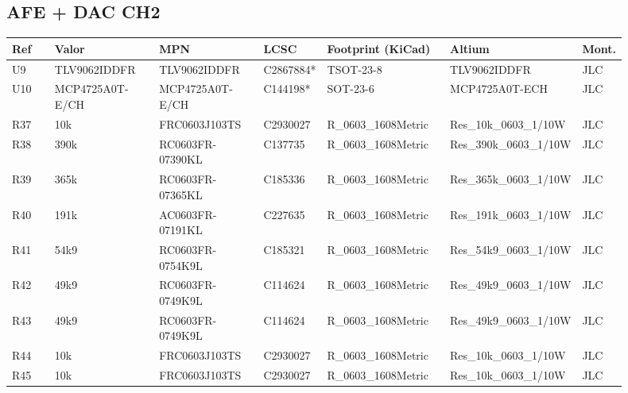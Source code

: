 \documentclass[10pt,a4paper]{article}
\begin{document}
\subsection*{AFE + DAC CH2}
{\scriptsize\begin{longtable}{@{}L{0.07\linewidth}L{0.17\linewidth}L{0.17\linewidth}L{0.09\linewidth}L{0.20\linewidth}L{0.14\linewidth}L{0.06\linewidth}@{}}\toprule
\textbf{Ref} & \textbf{Valor} & \textbf{MPN} & \textbf{LCSC} & \textbf{Footprint (KiCad)} & \textbf{Altium} & \textbf{Mont.}\\\midrule\endhead
U9 & TLV9062IDDFR & TLV9062IDDFR & C2867884* & TSOT-23-8 & TLV9062IDDFR & JLC\\
U10 & MCP4725A0T-E/CH & MCP4725A0T-E/CH & C144198* & SOT-23-6 & MCP4725A0T-ECH & JLC\\
R37 & 10k & FRC0603J103TS & C2930027 & R\_\allowbreak{}0603\_\allowbreak{}1608Metric & Res\_\allowbreak{}10k\_\allowbreak{}0603\_\allowbreak{}1/10W & JLC\\
R38 & 390k & RC0603FR-07390KL & C137735 & R\_\allowbreak{}0603\_\allowbreak{}1608Metric & Res\_\allowbreak{}390k\_\allowbreak{}0603\_\allowbreak{}1/10W & JLC\\
R39 & 365k & RC0603FR-07365KL & C185336 & R\_\allowbreak{}0603\_\allowbreak{}1608Metric & Res\_\allowbreak{}365k\_\allowbreak{}0603\_\allowbreak{}1/10W & JLC\\
R40 & 191k & AC0603FR-07191KL & C227635 & R\_\allowbreak{}0603\_\allowbreak{}1608Metric & Res\_\allowbreak{}191k\_\allowbreak{}0603\_\allowbreak{}1/10W & JLC\\
R41 & 54k9 & RC0603FR-0754K9L & C185321 & R\_\allowbreak{}0603\_\allowbreak{}1608Metric & Res\_\allowbreak{}54k9\_\allowbreak{}0603\_\allowbreak{}1/10W & JLC\\
R42 & 49k9 & RC0603FR-0749K9L & C114624 & R\_\allowbreak{}0603\_\allowbreak{}1608Metric & Res\_\allowbreak{}49k9\_\allowbreak{}0603\_\allowbreak{}1/10W & JLC\\
R43 & 49k9 & RC0603FR-0749K9L & C114624 & R\_\allowbreak{}0603\_\allowbreak{}1608Metric & Res\_\allowbreak{}49k9\_\allowbreak{}0603\_\allowbreak{}1/10W & JLC\\
R44 & 10k & FRC0603J103TS & C2930027 & R\_\allowbreak{}0603\_\allowbreak{}1608Metric & Res\_\allowbreak{}10k\_\allowbreak{}0603\_\allowbreak{}1/10W & JLC\\
R45 & 10k & FRC0603J103TS & C2930027 & R\_\allowbreak{}0603\_\allowbreak{}1608Metric & Res\_\allowbreak{}10k\_\allowbreak{}0603\_\allowbreak{}1/10W & JLC\\

\end{longtable}}
\end{document}
